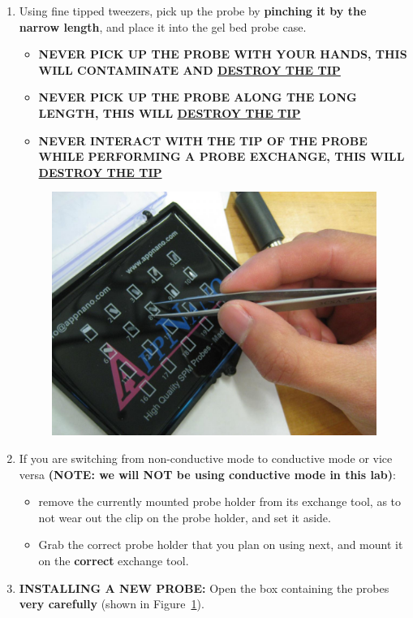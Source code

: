 \documentclass{../lab}
\begin{document}
\begin{enumerate}
    \item Using fine tipped tweezers, pick up the probe by \textbf{pinching it by the narrow length}, and place it into the gel bed probe case.
    \begin{itemize}
        \item \textbf{NEVER PICK UP THE PROBE WITH YOUR HANDS, THIS WILL CONTAMINATE AND \hyperref[subsec:BrokenTip]{DESTROY THE TIP}}

        \item \textbf{NEVER PICK UP THE PROBE ALONG THE LONG LENGTH, THIS WILL \hyperref[subsec:BrokenTip]{DESTROY THE TIP}}

        \item \textbf{NEVER INTERACT WITH THE TIP OF THE PROBE WHILE PERFORMING A PROBE EXCHANGE, THIS WILL \hyperref[subsec:BrokenTip]{DESTROY THE TIP}}
    \end{itemize}

    \begin{figure}[H]
        \centering
        \href{http://experimentationlab.berkeley.edu/sites/default/files/AFMImages/20.JPG}{\includegraphics[width=0.5\linewidth]{images/20.JPG}}
        \caption{}
        \label{fig:ProbeBox}
    \end{figure}
    
    \item If you are switching from non-conductive mode to conductive mode or vice versa \textbf{(NOTE: we will NOT be using conductive mode in this lab)}:
    \begin{itemize}
        \item remove the currently mounted probe holder from its exchange tool, as to not wear out the clip on the probe holder, and set it aside.

        \item Grab the correct probe holder that you plan on using next, and mount it on the \textbf{correct} exchange tool.
    \end{itemize}
    
    \item \textbf{INSTALLING A NEW PROBE:}  Open the box containing the probes \textbf{very carefully} (shown in Figure~\ref{fig:ProbeBox}).
    

\end{enumerate}
\end{document}
